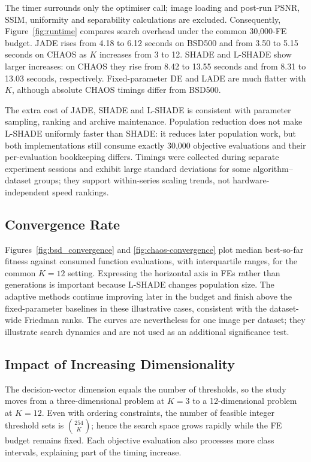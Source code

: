 \documentclass[review]{elsarticle}
\begin{document}
The timer surrounds only the optimiser call; image loading and post-run PSNR,
SSIM, uniformity and separability calculations are excluded. Consequently,
Figure~\ref{fig:runtime} compares search overhead under the common 30,000-FE
budget. JADE rises from 4.18 to 6.12 seconds on BSD500 and from 3.50 to
5.15 seconds on CHAOS as $K$ increases from 3 to 12. SHADE and L-SHADE show
larger increases: on CHAOS they rise from 8.42 to 13.55 seconds and from
8.31 to 13.03 seconds, respectively. Fixed-parameter DE and LADE are much
flatter with $K$, although absolute CHAOS timings differ from BSD500.

The extra cost of JADE, SHADE and L-SHADE is consistent with parameter
sampling, ranking and archive maintenance. Population reduction does not make
L-SHADE uniformly faster than SHADE: it reduces later population work, but
both implementations still consume exactly 30,000 objective evaluations and
their per-evaluation bookkeeping differs. Timings were collected during
separate experiment sessions and exhibit large standard deviations for some
algorithm--dataset groups; they support within-series scaling trends, not
hardware-independent speed rankings.


\subsection{Convergence Rate}

Figures~\ref{fig:bsd_convergence} and \ref{fig:chaos-convergence} plot median
best-so-far fitness against consumed function evaluations, with interquartile
ranges, for the common $K=12$ setting. Expressing the horizontal axis in FEs
rather than generations is important because L-SHADE changes population size.
The adaptive methods continue improving later in the budget and finish above
the fixed-parameter baselines in these illustrative cases, consistent with
the dataset-wide Friedman ranks. The curves are nevertheless for one image
per dataset; they illustrate search dynamics and are not used as an additional
significance test.


\subsection{Impact of Increasing Dimensionality}

The decision-vector dimension equals the number of thresholds, so the study
moves from a three-dimensional problem at $K=3$ to a 12-dimensional problem
at $K=12$. Even with ordering constraints, the number of feasible integer
threshold sets is $\binom{254}{K}$; hence the search space grows rapidly while
the FE budget remains fixed. Each objective evaluation also processes more
class intervals, explaining part of the timing increase.
\end{document}
